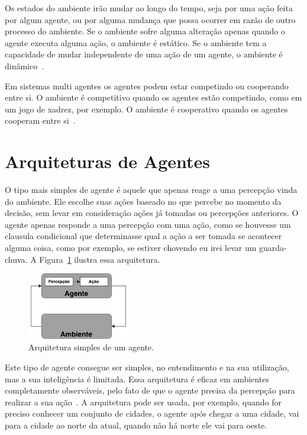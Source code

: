 Os estados do ambiente irão mudar ao longo do tempo, seja por uma ação feita por algum agente, ou por alguma mudança que possa ocorrer em razão de outro processo do ambiente.
Se o ambiente sofre alguma alteração apenas quando o agente executa alguma ação, o ambiente é estático. Se o ambiente tem a capacidade de mudar independente de uma ação de um agente, o ambiente é dinâmico~\cite{agent1999}.

Em sistemas multi agentes os agentes podem estar competindo ou cooperando entre si. O ambiente é competitivo quando os agentes estão competindo, como em um jogo de xadrez, por exemplo. 
O ambiente é cooperativo quando os agentes cooperam entre si~\cite[Capítulo 2]{intelligence2003modern}.

\section{Arquiteturas de Agentes}


O tipo mais simples de agente é aquele que apenas reage a uma percepção vinda do ambiente. Ele escolhe suas ações baseado no que percebe no momento da decisão, sem levar em consideração ações já tomadas ou percepções anteriores. O agente apenas responde a uma percepção com uma ação, como se houvesse um clausula condicional que determinasse qual a ação a ser tomada se acontecer alguma coisa, como por exemplo, se estiver chovendo eu irei levar um guarda-chuva. A Figura~\ref{fig:agenteSimple} ilustra essa arquitetura. 

\begin{figure}[ht]
	\centering
	\includegraphics[width=0.4\textwidth]{fig/agentSimple.pdf}
	\caption{Arquitetura simples de um agente.}
	\label{fig:agenteSimple}
\end{figure} 


Este tipo de agente consegue ser simples, no entendimento e na sua utilização, mas a sua inteligência é limitada. Essa arquitetura é eficaz em ambientes completamente observáveis, pelo fato de que o agente precisa da percepção para realizar a sua ação~\cite[Capítulo 7]{intelligence2003modern}. A arquitetura pode ser usada, por exemplo, quando for preciso conhecer um conjunto de cidades, o agente após chegar a uma cidade, vai para a cidade ao norte da atual, quando não há norte ele vai para oeste. 

